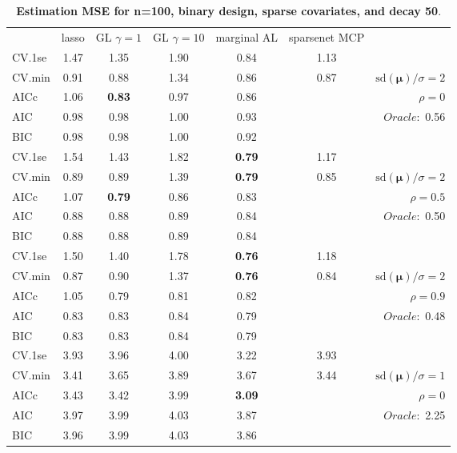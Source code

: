 \clearpage
\begin{table}\vspace{-.5cm}
\caption[l]{ { \bf Estimation MSE for n=100, binary design, 
sparse covariates, and  decay  50}.}
\vspace{-.5cm}
\footnotesize{}
\begin{center}
\begin{tabular}{l*{5}{c}|r}
& lasso & GL $\gamma=1$ & GL $\gamma=10$ & marginal AL & sparsenet MCP  & \\
 \cline{1-7}
CV.1se & 1.47 & 1.35 & 1.90 & 0.84 & 1.13 & \\
CV.min & 0.91 & 0.88 & 1.34 & 0.86 & 0.87 &  $\mathrm{sd}(\mathbf{\mu})/\sigma=2$ \\
AICc & 1.06 & {\bf 0.83} & 0.97 & 0.86 & & $\rho=0$ \\
AIC & 0.98 & 0.98 & 1.00 & 0.93 & &  \multirow{2}{*}{$Oracle: $ 0.56} \\
BIC & 0.98 & 0.98 & 1.00 & 0.92 & &  \\
 \hline 
CV.1se & 1.54 & 1.43 & 1.82 & {\bf 0.79} & 1.17 & \\
CV.min & 0.89 & 0.89 & 1.39 & {\bf 0.79} & 0.85 &  $\mathrm{sd}(\mathbf{\mu})/\sigma=2$ \\
AICc & 1.07 & {\bf 0.79} & 0.86 & 0.83 & & $\rho=0.5$ \\
AIC & 0.88 & 0.88 & 0.89 & 0.84 & &  \multirow{2}{*}{$Oracle: $ 0.50} \\
BIC & 0.88 & 0.88 & 0.89 & 0.84 & &  \\
 \hline 
CV.1se & 1.50 & 1.40 & 1.78 & {\bf 0.76} & 1.18 & \\
CV.min & 0.87 & 0.90 & 1.37 & {\bf 0.76} & 0.84 &  $\mathrm{sd}(\mathbf{\mu})/\sigma=2$ \\
AICc & 1.05 & 0.79 & 0.81 & 0.82 & & $\rho=0.9$ \\
AIC & 0.83 & 0.83 & 0.84 & 0.79 & &  \multirow{2}{*}{$Oracle: $ 0.48} \\
BIC & 0.83 & 0.83 & 0.84 & 0.79 & &  \\
 \hline 
CV.1se & 3.93 & 3.96 & 4.00 & 3.22 & 3.93 & \\
CV.min & 3.41 & 3.65 & 3.89 & 3.67 & 3.44 &  $\mathrm{sd}(\mathbf{\mu})/\sigma=1$ \\
AICc & 3.43 & 3.42 & 3.99 & {\bf 3.09} & & $\rho=0$ \\
AIC & 3.97 & 3.99 & 4.03 & 3.87 & &  \multirow{2}{*}{$Oracle: $ 2.25} \\
BIC & 3.96 & 3.99 & 4.03 & 3.86 & &  \\

\end{tabular}
\end{center}
\end{table}
